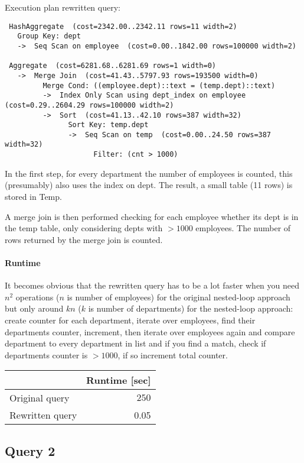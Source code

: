 \documentclass[11pt]{scrartcl}
\begin{document}
Execution plan rewritten query:

\begin{verbatim}
 HashAggregate  (cost=2342.00..2342.11 rows=11 width=2)
   Group Key: dept
   ->  Seq Scan on employee  (cost=0.00..1842.00 rows=100000 width=2)

 Aggregate  (cost=6281.68..6281.69 rows=1 width=0)
   ->  Merge Join  (cost=41.43..5797.93 rows=193500 width=0)
         Merge Cond: ((employee.dept)::text = (temp.dept)::text)
         ->  Index Only Scan using dept_index on employee  (cost=0.29..2604.29 rows=100000 width=2)
         ->  Sort  (cost=41.13..42.10 rows=387 width=32)
               Sort Key: temp.dept
               ->  Seq Scan on temp  (cost=0.00..24.50 rows=387 width=32)
                     Filter: (cnt > 1000)
\end{verbatim}

In the first step, for every department the number of employees is counted,
this (presumably) also uses the index on dept. The result, a small table (11 rows)
is stored in Temp.

A merge join is then performed checking for each employee whether its dept
is in the temp table, only considering depts with $>1000$ employees. The number
of rows returned by the merge join is counted.


\paragraph{Runtime} It becomes obvious that the rewritten query has to
be a lot faster when you need $n^2$ operations ($n$ is number of employees)
for the original nested-loop
approach but only around $kn$ ($k$ is number of departments) for the nested-loop
approach: create counter for each department, iterate over employees,
find their departments counter, increment,
then iterate over employees again and compare department to every department in list
and if you find a match, check if departments counter is $>1000$,
if so increment total counter.


\begin{table}[H]
  \begin{tabular}{l|r}
    & Runtime [sec] \\
   \hline
    Original query & $250$\\
    Rewritten query & 0.05\\
  \end{tabular}
\end{table}

\subsection*{Query 2}
\end{document}

